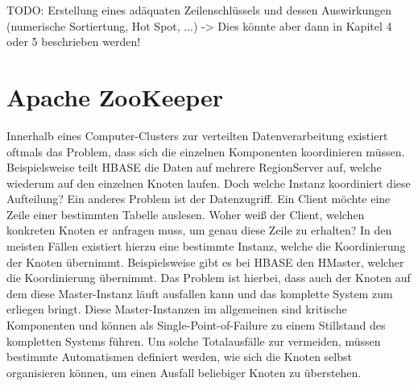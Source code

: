 \noindent
TODO: Erstellung eines adäquaten Zeilenschlüssels und dessen Auswirkungen (numerische Sortiertung, Hot Spot, ...) -> Dies könnte aber dann in Kapitel 4 oder 5 beschrieben werden!


\section{Apache ZooKeeper}
\label{sec:theory_zookeeper}

Innerhalb eines Computer-Clusters zur verteilten Datenverarbeitung existiert oftmals das Problem, dass sich die einzelnen Komponenten koordinieren müssen. Beispielsweise teilt HBASE die Daten auf mehrere RegionServer auf, welche wiederum auf den einzelnen Knoten laufen. Doch welche Instanz koordiniert diese Aufteilung? Ein anderes Problem ist der Datenzugriff. Ein Client möchte eine Zeile einer bestimmten Tabelle auslesen. Woher weiß der Client, welchen konkreten Knoten er anfragen muss, um genau diese Zeile zu erhalten? In den meisten Fällen existiert hierzu eine bestimmte Instanz, welche die Koordinierung der Knoten übernimmt. Beispielsweise gibt es bei HBASE den HMaster, welcher die Koordinierung übernimmt. Das Problem ist hierbei, dass auch der Knoten auf dem diese Master-Instanz läuft ausfallen kann und das komplette System zum erliegen bringt. Diese Master-Instanzen im allgemeinen sind kritische Komponenten und können als Single-Point-of-Failure zu einem Stillstand des kompletten Systems führen. Um solche Totalausfälle zur vermeiden, müssen bestimmte Automatismen definiert werden, wie sich die Knoten selbst organisieren können, um einen Ausfall beliebiger Knoten zu überstehen.\\


